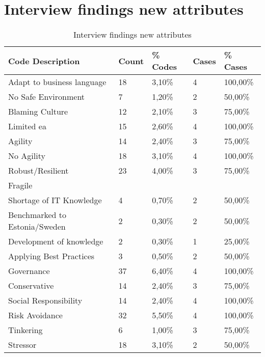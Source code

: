 \section{Interview findings new attributes}
\label{sec:interviewresultsnewattributes}
\begin{table}[H]
	\centering
	\begin{tabular}{lllll}
		\toprule
		\textbf{Code} \textbf{Description} & \textbf{Count} & \textbf{\% Codes} & \textbf{Cases} & \textbf{\% Cases} \\
		\midrule
		Adapt to business language & 18    & 3,10\% & 4     & 100,00\% \\
		No Safe Environment & 7     & 1,20\% & 2     & 50,00\% \\
		Blaming Culture & 12    & 2,10\% & 3     & 75,00\% \\
		Limited ea & 15    & 2,60\% & 4     & 100,00\% \\
		Agility & 14    & 2,40\% & 3     & 75,00\% \\
		No Agility & 18    & 3,10\% & 4     & 100,00\% \\
		Robust/Resilient & 23    & 4,00\% & 3     & 75,00\% \\
		Fragile &       &       &       &  \\
		Shortage of IT Knowledge & 4     & 0,70\% & 2     & 50,00\% \\
		Benchmarked to Estonia/Sweden & 2     & 0,30\% & 2     & 50,00\% \\
		Development of knowledge & 2     & 0,30\% & 1     & 25,00\% \\
		Applying Best Practices & 3     & 0,50\% & 2     & 50,00\% \\
		Governance & 37    & 6,40\% & 4     & 100,00\% \\
		Conservative & 14    & 2,40\% & 3     & 75,00\% \\
		Social Responsibility & 14    & 2,40\% & 4     & 100,00\% \\
		Risk Avoidance & 32    & 5,50\% & 4     & 100,00\% \\
		Tinkering & 6     & 1,00\% & 3     & 75,00\% \\
		Stressor & 18    & 3,10\% & 2     & 50,00\% \\
		\bottomrule
	\end{tabular}%
	\caption{Interview findings new attributes}%
	\label{tab:interviewresultsfindings}%
\end{table}%
